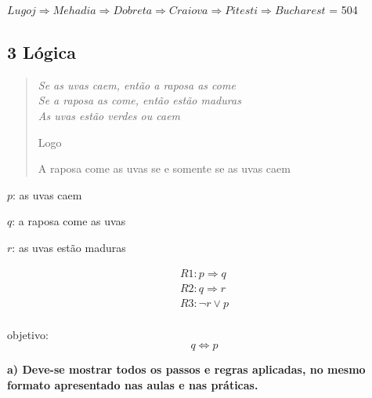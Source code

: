 $Lugoj \Rightarrow Mehadia \Rightarrow Dobreta \Rightarrow Craiova \Rightarrow Pitesti \Rightarrow Bucharest$ = 504

\subsection*{\textbf{3 Lógica}}
\begin{adjustwidth}{3em}{}
\begin{quote}
    \itshape
    Se as uvas caem, então a raposa as come \\
    Se a raposa as come, então estão maduras \\
    As uvas estão verdes ou caem

    Logo

    A raposa come as uvas se e somente se as uvas caem
\end{quote}
\end{adjustwidth}

$p$: as uvas caem 

$q$: a raposa come as uvas 

$r$: as uvas estão maduras

\begin{equation*}
    \begin{gathered}
        R1: p \Rightarrow q \\
        R2: q \Rightarrow r \\
        R3: \neg{r} \lor p \\
    \end{gathered}
\end{equation*}

objetivo: 
\begin{equation*}
    q \Leftrightarrow p
\end{equation*}



\begin{adjustwidth}{1em}{}
\textbf{a) Deve-se mostrar todos os passos e regras aplicadas, no mesmo formato
apresentado nas aulas e nas práticas.}
\end{adjustwidth}



